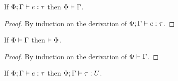 \begin{lemma} \label{lem:wf-env}
If $\Phi; \Gamma \mathrel{\vdash} e \mathrel{:} \tau$ then $\Phi \mathrel{\vdash} \Gamma$.
\end{lemma}
\begin{proof}
By induction on the derivation of $\Phi; \Gamma \mathrel{\vdash} e \mathrel{:} \tau$.
\end{proof}

\begin{lemma} \label{lem:wf-env-size}
If $\Phi \mathrel{\vdash} \Gamma$ then $\mathrel{\vdash} \Phi$.
\end{lemma}
\begin{proof}
By induction on the derivation of $\Phi \mathrel{\vdash} \Gamma$.
\end{proof}

\begin{theorem}[Regularity] \label{thm:regularity}
If $\Phi; \Gamma \mathrel{\vdash} e \mathrel{:} \tau$ then $\Phi; \Gamma \mathrel{\vdash} \tau \mathrel{:} U$.
\end{theorem}

